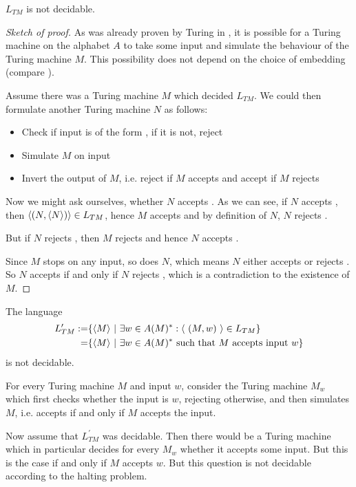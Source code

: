 \begin{Theorem}
	$L_{TM}$ is not decidable.\footnotemark
\end{Theorem}
\begin{proof}[Sketch of proof]
	As was already proven by Turing in \cite{tur36}, it is possible for a Turing machine on the alphabet $A$ to take some input  and simulate the behaviour of the Turing machine $M$.
	This possibility does not depend on the choice of embedding (compare \cite{sip06}).

	Assume there was a Turing machine $M$ which decided $L_{TM}$.
	We could then formulate another Turing machine $N$ as follows:
	\begin{itemize}
		\item Check if input is of the form , if it is not, reject
		\item Simulate $M$ on input 
		\item Invert the output of $M$, i.e. reject if $M$ accepts and accept if $M$ rejects
	\end{itemize}

	Now we might ask ourselves, whether $N$ accepts .
	As we can see, if $N$ accepts , then $\langle (N,\langle N \rangle) \rangle \in L_{TM}$, hence $M$ accepts  and by definition of $N$, $N$ rejects .
	
	But if $N$ rejects , then $M$ rejects  and hence $N$ accepts .

	Since $M$ stops on any input, so does $N$, which means $N$ either accepts or rejects .
	So $N$ accepts  if and only if $N$ rejects , which is a contradiction to the existence of $M$.
\end{proof}

\begin{Corollary}
	The language
	\begin{align*}
		L_{TM}^\prime
		:=& \{ \langle M \rangle ~|~ \exists w \in A(M)^*: \langle ~(M,w)~ \rangle \in L_{TM} \} \\
		=& \{ \langle M \rangle ~|~ \exists w \in A(M)^* ~\text{such that $M$ accepts input $w$} \}
	\end{align*}
	is not decidable.
\end{Corollary}
\proof
	For every Turing machine $M$ and input $w$, consider the Turing machine $M_w$ which first checks whether the input is $w$, rejecting otherwise, and then simulates $M$, i.e. accepts if and only if $M$ accepts the input.

	Now assume that $L_{TM}^\prime$ was decidable. Then there would be a Turing machine which in particular decides for every $M_w$ whether it accepts some input. But this is the case if and only if $M$ accepts $w$. But this question is not decidable according to the halting problem.
\endproof

